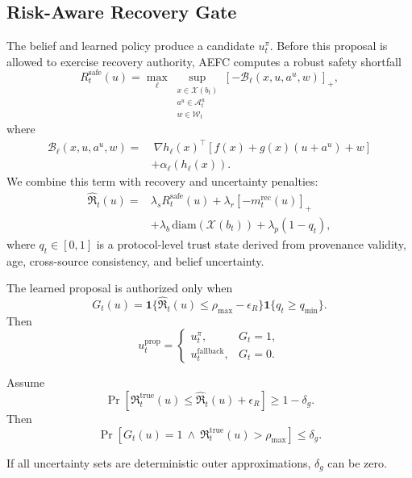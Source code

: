\subsection{Risk-Aware Recovery Gate}
The belief and learned policy produce a candidate $u_t^\pi$. Before this proposal is allowed to exercise recovery authority, AEFC computes a robust safety shortfall
\begin{equation}
R_t^{\mathrm{safe}}(u)=
\max_\ell
\sup_{\substack{x\in\mathcal X(b_t)\\
a^u\in\mathcal A_t^u\\
w\in\mathcal W_t}}
[-\mathcal B_\ell(x,u,a^u,w)]_+,
\end{equation}
where
\begin{align}
\mathcal B_\ell(x,u,a^u,w)
=&\ \nabla h_\ell(x)^\top
[f(x)+g(x)(u+a^u)+w] \nonumber\\
&+\alpha_\ell(h_\ell(x)).
\end{align}
We combine this term with recovery and uncertainty penalties:
\begin{align}
\widehat{\mathfrak R}_t(u)=&
\lambda_sR_t^{\mathrm{safe}}(u)
+\lambda_r[-m_t^{\mathrm{rec}}(u)]_+ \nonumber\\
&+\lambda_b\,\mathrm{diam}(\mathcal X(b_t))
+\lambda_p(1-q_t),
\end{align}
where $q_t\in[0,1]$ is a protocol-level trust state derived from provenance validity, age, cross-source consistency, and belief uncertainty.

The learned proposal is authorized only when
\begin{equation}
G_t(u)=
\mathbf 1\{\widehat{\mathfrak R}_t(u)\le\rho_{\max}-\epsilon_R\}
\mathbf 1\{q_t\ge q_{\min}\}.
\end{equation}
Then
\begin{equation}
u_t^{\mathrm{prop}}=
\begin{cases}
u_t^\pi,&G_t=1,\\
u_t^{\mathrm{fallback}},&G_t=0.
\end{cases}
\end{equation}

\begin{theorem}
Assume
\begin{equation}
\Pr[
\mathfrak R_t^{\mathrm{true}}(u)
\le\widehat{\mathfrak R}_t(u)+\epsilon_R]\ge1-\delta_g.
\end{equation}
Then
\begin{equation}
\Pr[G_t(u)=1\ \wedge\
\mathfrak R_t^{\mathrm{true}}(u)>\rho_{\max}]
\le\delta_g.
\end{equation}
\end{theorem}
If all uncertainty sets are deterministic outer approximations, $\delta_g$ can be zero.

